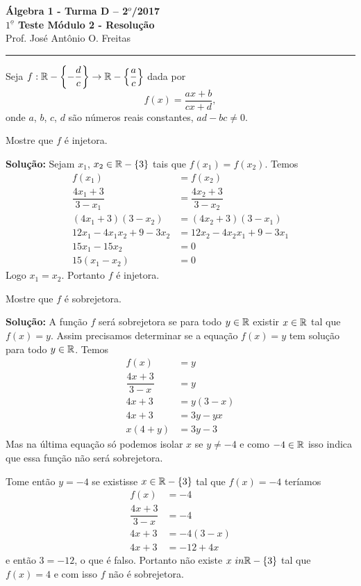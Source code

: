 \documentclass[12pt]{article}
\begin{document}


\begin{center}
{\Large\bf {\'A}lgebra 1 - Turma D -- 2$^{o}$/2017} \\ \vspace{9pt} {\large\bf
  $1^{\underline{o}}$ Teste Módulo 2 - Resolu\c{c}\~ao}\\
\vspace{9pt} Prof. Jos{\'e} Ant{\^o}nio O. Freitas
\end{center}
\hrule

\vspace{.6cm}

Seja $f : \mathbb{R} - \left\{-\dfrac{d}{c}\right\} \to \mathbb{R}  - \left\{\dfrac{a}{c}\right\}$ dada por
\[
	f(x) =  \dfrac{ax + b}{cx + d},
\]
onde $a$, $b$, $c$, $d$ s{\~a}o n{\'u}meros reais constantes, $ad - bc \ne 0$.
\vspace{.5cm}

\questao Mostre que $f$ é injetora.

\noindent\textbf{Solu\c{c}\~ao:} Sejam $x_1$, $x_2 \in \mathbb{R} - \{3\}$ tais que $f(x_1) = f(x_2)$. Temos
\begin{align*}
	f(x_1) &= f(x_2)\\
	\dfrac{4x_1 + 3}{3 - x_1} &= \dfrac{4x_2 + 3}{3 - x_2}\\
	(4x_1 + 3)(3 - x_2) &= (4x_2 + 3)(3 - x_1)\\
	12x_1 - 4x_1x_2 + 9 - 3x_2 &= 12x_2 - 4x_2x_1 + 9 - 3x_1\\
	15x_1 - 15x_2 &= 0\\
	15(x_1 - x_2) &= 0
\end{align*}
Logo $x_1 = x_2$. Portanto $f$ é injetora.

\vspace{.5cm}

\questao Mostre que $f$ é sobrejetora.

\noindent\textbf{Solu\c{c}\~ao:} A função $f$ será sobrejetora se para todo $y \in \mathbb{R}$ existir $x \in \mathbb{R}$ tal que $f(x) = y$. Assim precisamos determinar se a equação $f(x) = y$ tem solução para todo $y \in \mathbb{R}$.
Temos
\begin{align*}
	f(x) &= y\\
	\dfrac{4x + 3}{3 - x} &= y\\
	4x + 3 &= y(3 - x)\\
	4x + 3 &= 3y - yx\\
	x(4 + y) &= 3y - 3
\end{align*}
Mas na última equação só podemos isolar $x$ se $y \ne -4$ e como $-4 \in \mathbb{R}$ isso indica que essa função não será sobrejetora.

Tome então $y = -4$ se existisse $x \in \mathbb{R} - \{3\}$ tal que $f(x) = -4$ teríamos
\begin{align*}
	f(x) &= -4\\
	\dfrac{4x + 3}{3 - x} &= -4\\
	4x + 3 &= -4(3 - x)\\
	4x + 3 &= -12 + 4x
\end{align*}
e então $3 = -12$, o que é falso. Portanto não existe $x \ in \mathbb{R} - \{3\}$ tal que $f(x) = 4$ e com isso $f$ não é sobrejetora.
\end{document}
